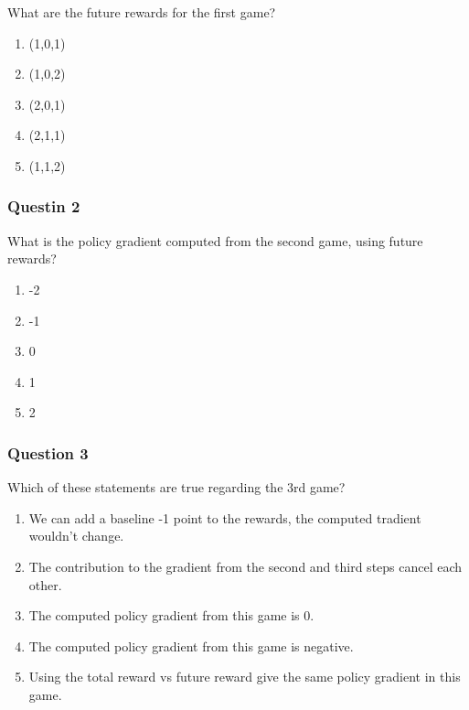 \documentclass[11pt]{article}
\providecommand{\tightlist}{%
      \setlength{\itemsep}{0pt}\setlength{\parskip}{0pt}}
\begin{document}
What are the future rewards for the first game?

\begin{enumerate}
\def\labelenumi{\arabic{enumi}.}
\tightlist
\item
  (1,0,1)
\item
  (1,0,2)
\item
  (2,0,1)
\item
  (2,1,1)
\item
  (1,1,2)
\end{enumerate}

    \hypertarget{questin-2}{%
\subsubsection{Questin 2}\label{questin-2}}

What is the policy gradient computed from the second game, using future
rewards?

\begin{enumerate}
\def\labelenumi{\arabic{enumi}.}
\tightlist
\item
  -2
\item
  -1
\item
  0
\item
  1
\item
  2
\end{enumerate}

    \hypertarget{question-3}{%
\subsubsection{Question 3}\label{question-3}}

Which of these statements are true regarding the 3rd game?

\begin{enumerate}
\def\labelenumi{\arabic{enumi}.}
\tightlist
\item
  We can add a baseline -1 point to the rewards, the computed tradient
  wouldn't change.
\item
  The contribution to the gradient from the second and third steps
  cancel each other.
\item
  The computed policy gradient from this game is 0.
\item
  The computed policy gradient from this game is negative.
\item
  Using the total reward vs future reward give the same policy gradient
  in this game.
\end{enumerate}
\end{document}
